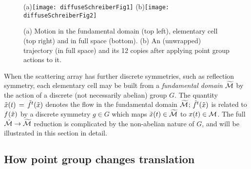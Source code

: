 


\begin{figure}[htbp]
  \begin{center}
    (a)\texttt{[image: diffuseSchreiberFig1]}
    (b)\texttt{[image: diffuseSchreiberFig2]}
  \end{center}
  \caption[]{\label{fig-schrieberFig12}
  (a) Motion in the fundamental domain (top left), elementary cell (top
      right) and  in full space (bottom).
  (b) An (unwrapped) trajectory (in full  space) and its 12 copies after
      applying point group actions to it.
  }
\end{figure}


When the scattering array has further discrete symmetries, such as
reflection symmetry, each elementary cell may be built from a {\em
fundamental domain} ${\widetilde {{\cal M}}}$ by the action of a discrete (not
necessarily abelian) group $G$. The quantity $\tilde x(t)\,=\,{\tilde{f}^{t}(\tilde x)}$
denotes the flow in the fundamental domain ${\widetilde {{\cal M}}}$;
${\tilde{f}^{t}(\tilde x)}$ is related to${f^{}(\tilde x)}$ by a discrete symmetry $g
\in G$ which maps $\tilde x(t)\in{\widetilde {\ensuremath{{\cal M}}}}$ to ${x}(t) \in {\ensuremath{{\cal M}}}$. The
full $\hat {{\cal M}} \rightarrow {\widetilde{\ensuremath{{\cal M}}}}$ reduction is complicated by the
non-abelian nature of $G$, and will be illustrated in this section in
detail.

\subsection{How point group changes translation}

